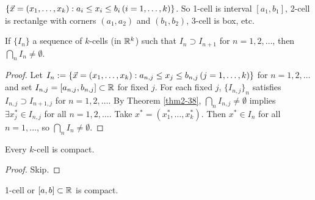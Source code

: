 \documentclass[]{article}
\begin{document}
\begin{definition}
	[$k$-cell] $\{\vec{x} = (x_1,\dots,x_k) : a_i\leq x_i\leq b_i\, (i = 1,\dots,k)\}$. So 1-cell is interval $[a_1,b_1]$, 2-cell is rectanlge with corners $(a_1,a_2)$ and $(b_1,b_2)$, 3-cell is box, etc.
\end{definition}
\begin{theorem}
	If $\{I_n\}$ a sequence of $k$-cells (in $\mathbb{R}^k$) such that $I_n\supset I_{n+1}$ for $n=1,2,\dots$, then $\bigcap_n I_n\neq\emptyset$.
\end{theorem}
\begin{proof}
	Let $I_n:=\{\vec{x} = (x_1,\dots,x_k): a_{n,j} \leq x_j \leq b_{n,j} \, (j = 1,\dots,k)\}$ for $n = 1,2,\dots$ and set $I_{n,j} = [a_{n,j},b_{n,j}] \subset \mathbb{R}$ for fixed $j$.
	For each fixed \ul{$j$}, $\{I_{n,j}\}_n$ satisfies $I_{n,j} \supset I_{n+1,j}$ for $n = 1,2,\dots$.
	By Theorem \ref{thm2-38}, $\bigcap_n I_{n,j} \neq \emptyset$ implies $\exists x_j^*\in I_{n,j}$ for all $n=1,2,\dots$.
	Take $x^* = (x_1^*,\dots,x_k^*)$. Then $x^*\in I_n$ for all $n=1,\dots$, so $\bigcap_n I_n\neq \emptyset$.
\end{proof}

\begin{theorem}
	Every $k$-cell is compact.
\end{theorem}
\begin{proof}
	Skip.
\end{proof}
\begin{example}
	1-cell or $[a,b]\subset \mathbb{R}$ is compact.
\end{example}
\end{document}
